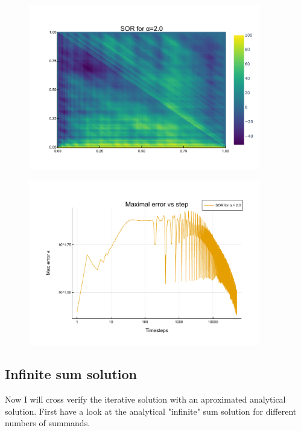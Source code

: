 \documentclass[
	a4paper, %
	10pt, %
]{CSUniSchoolLabReport}
\begin{document}
\begin{figure}[H]
	\centering
	\includegraphics[width=0.9\textwidth]{../saves_t1/broken_SOR_heatmap.pdf}
\end{figure}

\begin{figure}[H]
	\centering
	\includegraphics[width=0.9\textwidth]{../saves_t1/broken_SOR_error.pdf}
\end{figure}

\subsection{Infinite sum solution}

Now I will cross verify the iterative solution with an aproximated analytical solution. First have a look at the analytical "infinite" sum solution for different numbers of summands. 
\end{document}

